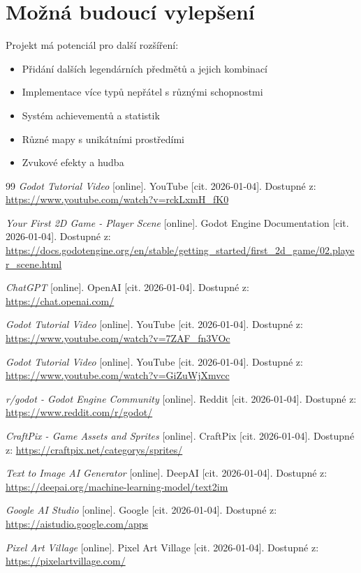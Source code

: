 \documentclass[12pt, a4paper,
oneside
]{report}
\begin{document}
	\section*{Možná budoucí vylepšení}
	
	Projekt má potenciál pro další rozšíření:
	\begin{itemize}
		\item Přidání dalších legendárních předmětů a jejich kombinací
		\item Implementace více typů nepřátel s různými schopnostmi
		\item Systém achievementů a statistik
		\item Různé mapy s unikátními prostředími
		\item Zvukové efekty a hudba
	\end{itemize}
	

	\renewcommand{\bibname}{Seznam použitelných informačních zdrojů}
	\nocite{*}
	
	\begin{thebibliography}{99}
		 \textit{Godot Tutorial Video} [online]. YouTube [cit. 2026-01-04]. Dostupné z: \url{https://www.youtube.com/watch?v=rckLxmH_fK0}
		
		 \textit{Your First 2D Game - Player Scene} [online]. Godot Engine Documentation [cit. 2026-01-04]. Dostupné z: \url{https://docs.godotengine.org/en/stable/getting_started/first_2d_game/02.player_scene.html}
		
		 \textit{ChatGPT} [online]. OpenAI [cit. 2026-01-04]. Dostupné z: \url{https://chat.openai.com/}
		
		 \textit{Godot Tutorial Video} [online]. YouTube [cit. 2026-01-04]. Dostupné z: \url{https://www.youtube.com/watch?v=7ZAF_fn3VOc}
		
		 \textit{Godot Tutorial Video} [online]. YouTube [cit. 2026-01-04]. Dostupné z: \url{https://www.youtube.com/watch?v=GiZuWjXmvcc}
		
		 \textit{r/godot - Godot Engine Community} [online]. Reddit [cit. 2026-01-04]. Dostupné z: \url{https://www.reddit.com/r/godot/}
		
		 \textit{CraftPix - Game Assets and Sprites} [online]. CraftPix [cit. 2026-01-04]. Dostupné z: \url{https://craftpix.net/categorys/sprites/}
		
		 \textit{Text to Image AI Generator} [online]. DeepAI [cit. 2026-01-04]. Dostupné z: \url{https://deepai.org/machine-learning-model/text2im}
		
		 \textit{Google AI Studio} [online]. Google [cit. 2026-01-04]. Dostupné z: \url{https://aistudio.google.com/apps}
		
		 \textit{Pixel Art Village} [online]. Pixel Art Village [cit. 2026-01-04]. Dostupné z: \url{https://pixelartvillage.com/}
	\end{thebibliography}
\end{document}
